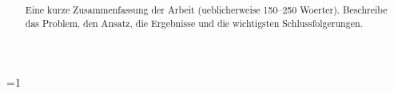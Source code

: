 \documentclass[a4paper,10pt]{report}
\title{\Large \textbf{\workTitle}}
\author{\workAuthor}
\date{\workDate}
\def\currentPreset{standard}
\def\includeAbstract{1}
\begin{document}


\setcounter{page}{1}

\ifnum\includeAbstract=1
    \begin{abstract}
        Eine kurze Zusammenfassung der Arbeit (ueblicherweise 150--250 Woerter).
        Beschreibe das Problem, den Ansatz, die Ergebnisse und die wichtigsten Schlussfolgerungen.
    \end{abstract}

    \newpage
\fi

\tableofcontents
\newpage

\setcounter{page}{1}






\newpage
\printbibliography[heading=bibintoc]

\appendix
\pagestyle{plain}

\end{document}
